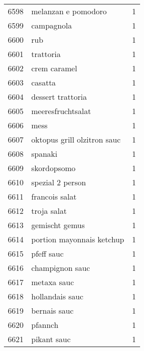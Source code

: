 \begin{tabular}{llr}
6598 &                                melanzan e pomodoro &      1 \\
6599 &                                         campagnola &      1 \\
6600 &                                                rub &      1 \\
6601 &                                          trattoria &      1 \\
6602 &                                       crem caramel &      1 \\
6603 &                                            casatta &      1 \\
6604 &                                  dessert trattoria &      1 \\
6605 &                                  meeresfruchtsalat &      1 \\
6606 &                                               mess &      1 \\
6607 &                        oktopus grill olzitron sauc &      1 \\
6608 &                                            spanaki &      1 \\
6609 &                                        skordopsomo &      1 \\
6610 &                                   spezial 2 person &      1 \\
6611 &                                     francois salat &      1 \\
6612 &                                        troja salat &      1 \\
6613 &                                     gemischt gemus &      1 \\
6614 &                          portion mayonnais ketchup &      1 \\
6615 &                                         pfeff sauc &      1 \\
6616 &                                    champignon sauc &      1 \\
6617 &                                        metaxa sauc &      1 \\
6618 &                                    hollandais sauc &      1 \\
6619 &                                       bernais sauc &      1 \\
6620 &                                            pfannch &      1 \\
6621 &                                        pikant sauc &      1 \\

\end{tabular}
